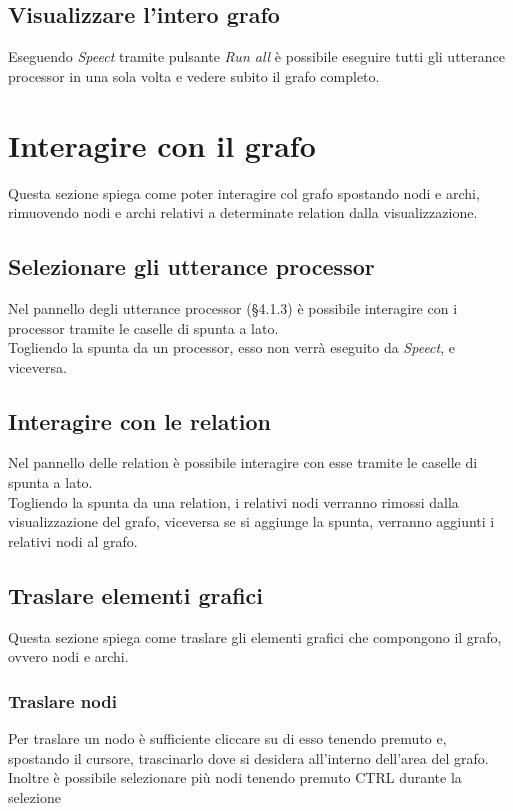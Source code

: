 \documentclass[openany,12pt,a4paper]{report}
\begin{document}
	\subsection{Visualizzare l'intero grafo}
	Eseguendo \textit{Speect} tramite pulsante \textit{Run all} è possibile eseguire tutti gli utterance processor in una sola volta e vedere subito il grafo completo.
	
	\section{Interagire con il grafo}
	Questa sezione spiega come poter interagire col grafo spostando nodi e archi, rimuovendo nodi e archi relativi a determinate relation dalla visualizzazione.
	
	\subsection{Selezionare gli utterance processor}
	Nel pannello degli utterance processor (§4.1.3) è possibile interagire con i processor tramite le caselle di spunta a lato.\\
	Togliendo la spunta da un processor, esso non verrà eseguito da \textit{Speect}, e viceversa.
	
	\subsection{Interagire con le relation}
	Nel pannello delle relation è possibile interagire con esse tramite le caselle di spunta a lato.\\
	Togliendo la spunta da una relation, i relativi nodi verranno rimossi dalla visualizzazione del grafo, viceversa se si aggiunge la spunta, verranno aggiunti i relativi nodi al grafo.
	
	\subsection{Traslare elementi grafici}
	Questa sezione spiega come traslare gli elementi grafici che compongono il grafo, ovvero nodi e archi.
	
	\subsubsection{Traslare nodi}
	Per traslare un nodo è sufficiente cliccare su di esso tenendo premuto e, spostando il cursore, trascinarlo dove si desidera all'interno dell'area del grafo.
	Inoltre è possibile selezionare più nodi tenendo premuto CTRL durante la selezione
	
\end{document}
